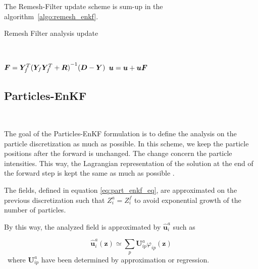 The Remesh-Filter update scheme is sum-up in the algorithm~\ref{algo:remesh_enkf}.

\begin{algorithm}

    \caption{Remesh Filter analysis update}~\label{algo:remesh_enkf}

    $ \bm{F} = \bm Y_f^T {(\bm Y_f \bm Y_f^T + \bm R)}^{-1}(\bm{D} - \bm{Y})$ 
    $\bm u = \bm u + \bm u \bm{F}$ 
\end{algorithm}

\subsection{Particles-EnKF}~\label{part_enkf}

The goal of the Particles-EnKF formulation is to define the analysis on the particle discretization as much as possible. In this scheme, we keep the particle positions after the forward is unchanged. The change concern the particle intensities. This way, the Lagrangian representation of the solution at the end of the forward step is kept the same as much as possible .

The fields, defined in equation \eqref{eq:part_enkf_eq}, are approximated on the previous discretization such that $Z^a_i = Z_i^f$ to avoid exponential growth of the number of particles.


By this way, the analyzed field is approximated by $\hat{\bm u}^a_i$ such as

\begin{equation*}
    \hat{\bm u}^a_i(\bm z) \simeq \sum_p \bm U^a_{ip} \varphi_{ip}(\bm z)
\end{equation*}~where $\bm U^a_{ip}$ have been determined by approximation or regression.


